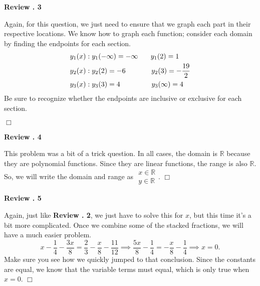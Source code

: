 \documentclass[lang=en,11pt]{elegantbook}
\begin{document}
\noindent \textbf{Review . 3}

Again, for this question, we just need to ensure that we graph each part in their respective locations.  We know how to graph each function; consider each domain by finding the endpoints for each section. \begin{align*}
    y_1(x) &: y_1(-\infty)=-\infty \hspace{0.25in} y_1(2)=1 \\
    y_2(x) &: y_2(2)=-6 \hspace{0.51in} y_2(3)=-\dfrac{19}{2} \\
    y_3(x) &: y_3(3)=4 \hspace{0.62in} y_3(\infty)=4
\end{align*}
Be sure to recognize whether the endpoints are inclusive or exclusive for each section.
\begin{figure}[!ht]
    \centering
\end{figure} $\Box$\vspace{3mm}

\noindent \textbf{Review . 4}

This problem was a bit of a trick question.  In all cases, the domain is $\mathbb{R}$ because they are polynomial functions.  Since they are linear functions, the range is also $\mathbb{R}$.  So, we will write the domain and range as $\boxed{\begin{matrix} x\in\mathbb{R} \\ y\in\mathbb{R}\end{matrix}}$. $\Box$

\noindent \textbf{Review . 5}

Again, just like \textbf{Review . 2}, we just have to solve this for $x$, but this time it's a bit more complicated.  Once we combine some of the stacked fractions, we will have a much easier problem.  $$x-\dfrac{1}{4}-\dfrac{3x}{8}=\dfrac{2}{3}-\dfrac{x}{8}-\dfrac{11}{12} \implies \dfrac{5x}{8}-\dfrac{1}{4}=-\dfrac{x}{8}-\dfrac{1}{4} \implies \boxed{x=0}.$$ 
Make sure you see how we quickly jumped to that conclusion.  Since the constants are equal, we know that the variable terms must equal, which is only true when $x=0$.  $\Box$\vspace{3mm}
\end{document}
